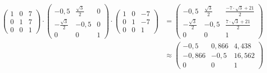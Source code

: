 \documentclass[11pt]{article}
\begin{document}
\begin{enumerate}
        \begin{align*}
          \begin{pmatrix*}
            1 & 0 & 7 \\
            0 & 1 & 7 \\
            0 & 0 & 1
          \end{pmatrix*} \cdot \begin{pmatrix*}
                                 -0,5 & \frac{\sqrt{3}}{2} & 0 \\
                                 -\frac{\sqrt{3}}{2} & -0,5 & 0 \\
                                 0 & 0 & 1
                               \end{pmatrix*} \cdot \begin{pmatrix*}
                                                      1 & 0 & -7 \\
                                                      0 & 1 & -7 \\
                                                      0 & 0 & 1
                                                    \end{pmatrix*} & = \begin{pmatrix*}
                                                                         -0,5 & \frac{\sqrt{3}}{2} &  \frac{-7 \cdot \sqrt{3} + 21}{2} \\
                                                                         -\frac{\sqrt{3}}{2} & -0,5 & \frac{7 \cdot \sqrt{3} + 21}{2} \\
                                                                         0 & 0 & 1
                                                                       \end{pmatrix*} \\
                                                          & \approx \begin{pmatrix*}
                                                                      -0,5 & 0,866 & 4,438 \\
                                                                      -0,866 & -0,5 & 16,562 \\
                                                                      0 & 0 & 1
                                                                    \end{pmatrix*}
        \end{align*}
\end{enumerate}
\end{document}
